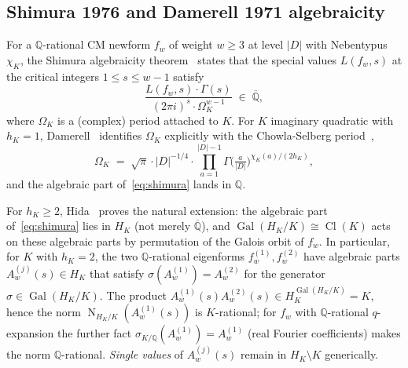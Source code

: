 \documentclass[11pt]{amsart}
\theoremstyle{definition}
\theoremstyle{remark}
\DeclareMathOperator{\Cl}{Cl}
\DeclareMathOperator{\Gal}{Gal}
\DeclareMathOperator{\Nm}{N}
\newcommand{\Q}{\mathbb{Q}}
\newcommand{\HK}{H_K}
\newcommand{\chiK}{\chi_K}
\begin{document}
\subsection{Shimura 1976 and Damerell 1971 algebraicity}
\label{ss:damerell-shimura}
For a $\Q$-rational CM newform $f_w$ of weight $w \geq 3$ at level
$|D|$ with Nebentypus $\chiK$, the Shimura algebraicity
theorem~\cite{Shimura1976} states that the special values
$L(f_w, s)$ at the critical integers $1 \leq s \leq w - 1$ satisfy
\begin{equation}\label{eq:shimura}
\frac{L(f_w, s) \cdot \Gamma(s)}{(2\pi i)^{s} \cdot
\Omega_K^{w-1}} \; \in \; \overline{\Q},
\end{equation}
where $\Omega_K$ is a (complex) period attached to $K$. For $K$
imaginary quadratic with $h_K = 1$, Damerell~\cite{Damerell1971}
identifies $\Omega_K$ explicitly with the Chowla-Selberg
period~\cite{ChowlaSelberg1949},
\begin{equation}\label{eq:Omega-K}
\Omega_K \; = \; \sqrt{\pi} \cdot |D|^{-1/4} \cdot \prod_{a = 1}^{|D|-1}
\Gamma\!\bigl(\tfrac{a}{|D|}\bigr)^{\chiK(a)/(2 h_K)},
\end{equation}
and the algebraic part of~\eqref{eq:shimura} lands in $\Q$.

For $h_K \geq 2$, Hida~\cite{Hida1981} proves the natural extension:
the algebraic part of~\eqref{eq:shimura} lies in $\HK$ (not merely
$\overline{\Q}$), and $\Gal(\HK/K) \cong \Cl(K)$ acts on these
algebraic parts by permutation of the Galois orbit of $f_w$. In
particular, for $K$ with $h_K = 2$, the two $\Q$-rational eigenforms
$f_w^{(1)}, f_w^{(2)}$ have algebraic parts $A_w^{(j)}(s) \in \HK$ that
satisfy $\sigma(A_w^{(1)}) = A_w^{(2)}$ for the generator
$\sigma \in \Gal(\HK/K)$. The product $A_w^{(1)}(s) A_w^{(2)}(s)
\in \HK^{\Gal(\HK/K)} = K$, hence the norm $\Nm_{\HK/K}(A_w^{(1)}(s))$
is $K$-rational; for $f_w$ with $\Q$-rational $q$-expansion the further
fact $\sigma_{K/\Q}(A_w^{(1)}) = A_w^{(1)}$ (real Fourier coefficients)
makes the norm $\Q$-rational. \emph{Single values} of $A_w^{(j)}(s)$
remain in $\HK \setminus K$ generically.
\end{document}
